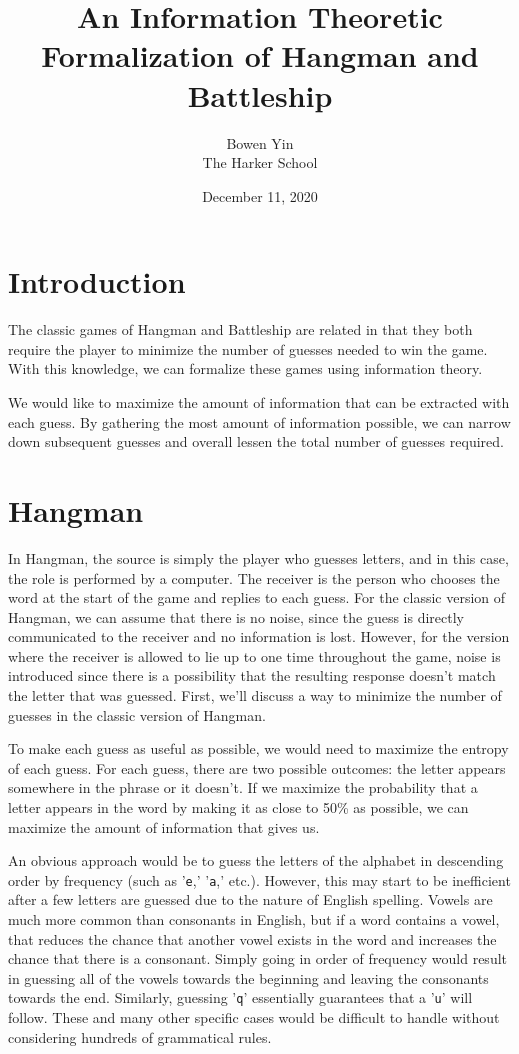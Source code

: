 \documentclass{article}
\title{An Information Theoretic Formalization of Hangman and Battleship}
\author{Bowen Yin \\ The Harker School}
\date{December 11, 2020}
\begin{document}
\maketitle

\section*{Introduction}
The classic games of Hangman and Battleship are related in that they both require the player to minimize the number of guesses needed to win the game. With this knowledge, we can formalize these games using information theory.

We would like to maximize the amount of information that can be extracted with each guess. By gathering the most amount of information possible, we can narrow down subsequent guesses and overall lessen the total number of guesses required.

\section*{Hangman}

In Hangman, the source is simply the player who guesses letters, and in this case, the role is performed by a computer. The receiver is the person who chooses the word at the start of the game and replies to each guess. For the classic version of Hangman, we can assume that there is no noise, since the guess is directly communicated to the receiver and no information is lost. However, for the version where the receiver is allowed to lie up to one time throughout the game, noise is introduced since there is a possibility that the resulting response doesn't match the letter that was guessed. First, we'll discuss a way to minimize the number of guesses in the classic version of Hangman.

To make each guess as useful as possible, we would need to maximize the entropy of each guess. For each guess, there are two possible outcomes: the letter appears somewhere in the phrase or it doesn't. If we maximize the probability that a letter appears in the word by making it as close to 50\% as possible, we can maximize the amount of information that gives us.

An obvious approach would be to guess the letters of the alphabet in descending order by frequency (such as '\texttt{e},' '\texttt{a},' etc.). However, this may start to be inefficient after a few letters are guessed due to the nature of English spelling. Vowels are much more common than consonants in English, but if a word contains a vowel, that reduces the chance that another vowel exists in the word and increases the chance that there is a consonant. Simply going in order of frequency would result in guessing all of the vowels towards the beginning and leaving the consonants towards the end. Similarly, guessing '\texttt{q}' essentially guarantees that a '\texttt{u}' will follow. These and many other specific cases would be difficult to handle without considering hundreds of grammatical rules.
\end{document}
